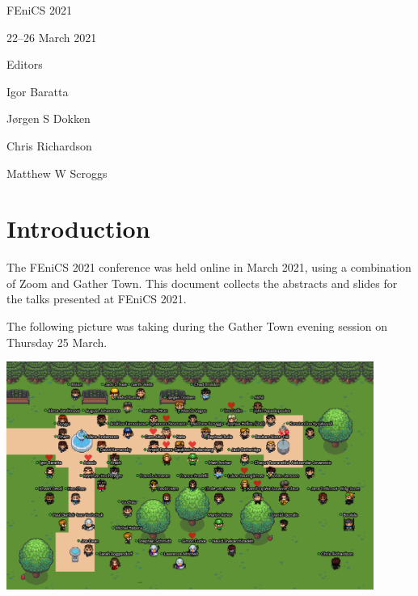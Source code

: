 \thispagestyle{empty}

\setcounter{page}{0}
\vspace*{6cm}
\begin{center}
\setmainfont[Scale=6]{Lato Bold}
FEniCS 2021
\end{center}
\begin{center}
\setmainfont[Scale=4]{Lato Bold}
22--26 March 2021
\end{center}

\vspace{8cm}

\begin{center}
\setmainfont[Scale=2]{Lato Bold}
Editors
\end{center}
\begin{center}
\setmainfont[Scale=1.3]{Lato}
Igor Baratta
\end{center}
\begin{center}
\setmainfont[Scale=1.3]{Lato}
J{\o}rgen S Dokken
\end{center}
\begin{center}
\setmainfont[Scale=1.3]{Lato}
Chris Richardson
\end{center}
\begin{center}
\setmainfont[Scale=1.3]{Lato}
Matthew W Scroggs
\end{center}


\tableofcontents


\chapter*{Introduction}
\setcounter{page}{1}

The FEniCS 2021 conference was held online in March 2021, using a combination of Zoom and Gather Town.
This document collects the abstracts and slides for the talks presented at FEniCS 2021.

The following picture was taking during the Gather Town evening session on Thursday 25 March.

\begin{center}
\includegraphics[width=0.9\textwidth]{../files/img/small-photo.png}
\end{center}

